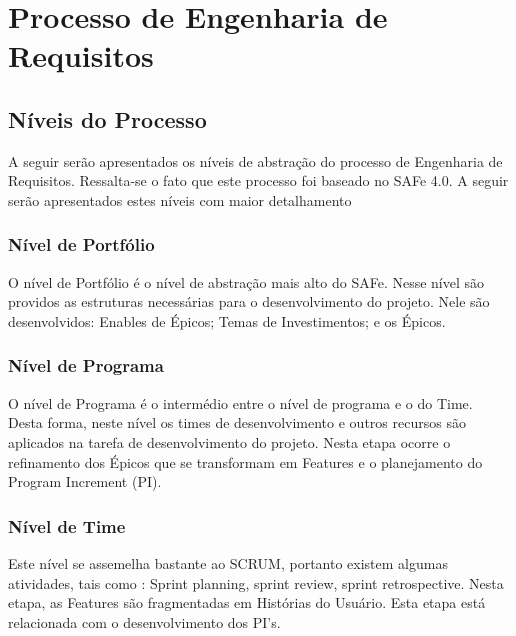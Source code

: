 \chapter[Processo de Engenharia de Requisitos]{Processo de Engenharia de Requisitos}

{
    \large{\section {Níveis do Processo\\} }

    \tab A seguir serão apresentados os níveis de abstração do processo de Engenharia de Requisitos. Ressalta-se o fato que este processo foi baseado no SAFe 4.0. A seguir serão apresentados estes níveis com maior detalhamento\\

}

{
    \large{\subsection {Nível de Portfólio\\} }

    \tab O nível de Portfólio é o nível de abstração mais alto do SAFe. Nesse nível são providos as estruturas necessárias para o desenvolvimento do projeto.  Nele são desenvolvidos: Enables de Épicos; Temas de Investimentos; e os Épicos. \\

}


{
     \large{\subsection {Nível de Programa\\} }

     \tab O nível de Programa é o intermédio entre o nível de programa e o do Time. Desta forma, neste nível os times de desenvolvimento e outros recursos são aplicados na tarefa de desenvolvimento do projeto.  Nesta etapa ocorre o refinamento dos Épicos que se transformam em Features e o planejamento do Program Increment (PI).\\
}

{
    \large{\subsection {Nível de Time\\} }

    \tab Este nível se assemelha bastante ao SCRUM,  portanto existem algumas atividades, tais como : Sprint planning, sprint review, sprint retrospective. Nesta etapa, as Features são fragmentadas em Histórias do Usuário. Esta etapa está relacionada com o desenvolvimento dos PI’s. \\
}

